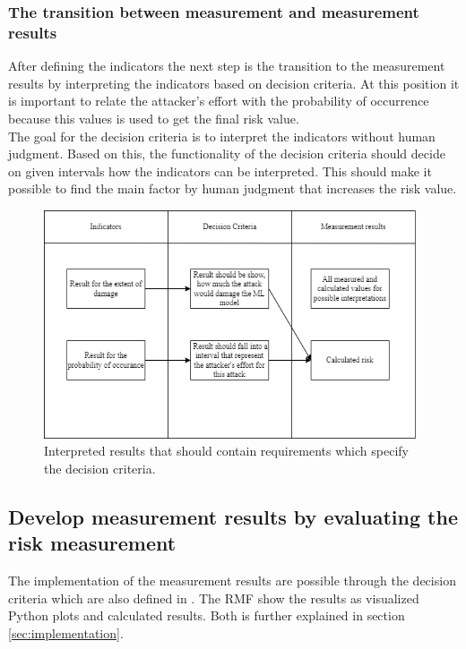 \subsubsection*{The transition between measurement and measurement results}

After defining the indicators the next step is the transition to the measurement results by interpreting the indicators based on decision criteria. At this position it is important to relate the attacker's effort with the probability of occurrence because this values is used to get the final risk value. \\
The goal for the decision criteria is to interpret the indicators without human judgment. Based on this, the functionality of the decision criteria should decide on given intervals how the indicators can be interpreted. This should make it possible to find the main factor by human judgment that increases the risk value.

\begin{figure}[ht!]
  \centering
  \includegraphics[width=11cm]{pictures/measurement_results_concept.png}
  \caption{Interpreted results that should contain requirements which specify the decision criteria.}
  \label{fig:measurement_results_concept}
\end{figure}

\subsection{Develop measurement results by evaluating the risk measurement}
\label{sec:measurement_results}

The implementation of the measurement results are possible through the decision criteria which are also defined in \cite{ISO_27004_2009}. The RMF show the results as visualized Python plots and calculated results. Both is further explained in section \ref{sec:implementation}.

